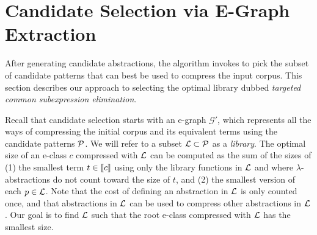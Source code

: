 \section{Candidate Selection via E-Graph Extraction}\label{sec:beam}


After generating candidate abstractions,
  the  algorithm invokes  to pick the subset of candidate patterns
  that can best be used to compress the input corpus.
%
This section describes our approach to selecting the optimal library dubbed
  \emph{targeted common subexpression elimination}.


%
Recall that candidate selection starts with an e-graph $\mathcal{G}'$,
  which represents all the ways of compressing the initial corpus and its equivalent terms
  using the candidate patterns $\mathcal{P}$.
%  
We will refer to a subset $\mathcal{L} \subset \mathcal{P}$ as a \emph{library}.
%
The optimal size of an e-class $c$ compressed with $\mathcal{L}$
  can be computed as the sum of the sizes of
  (1) the smallest term $t\in \llbracket c \rrbracket$
      using only the library functions in $\mathcal{L}$ and
      where $\lambda$-abstractions 
      do not count toward the size of $t$, and
  (2) the smallest version of each $p \in \mathcal{L}$.
Note that
  the cost of defining an abstraction
  in $\mathcal{L}$ is only counted once, and
  that abstractions in $\mathcal{L}$ can be used
  to compress other abstractions in $\mathcal{L}$.
%
Our goal is to find $\mathcal{L}$ such that the root e-class compressed with $\mathcal{L}$
  has the smallest size.

